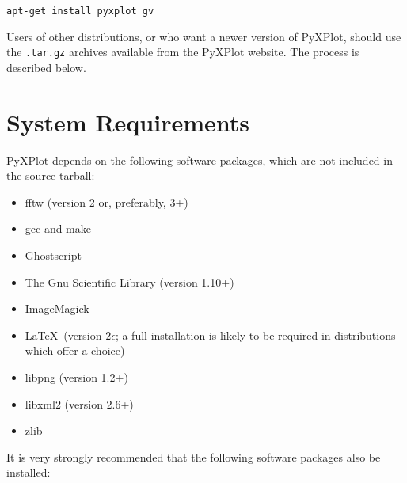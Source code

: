 \begin{verbatim}
apt-get install pyxplot gv
\end{verbatim}

Users of other distributions, or who want a newer version of PyXPlot, should
use the {\tt .tar.gz} archives available from the PyXPlot website. The process
is described below.

\section{System Requirements}

PyXPlot depends on the following software packages, which are not included in
the source tarball:

\vspace{0.5cm}
\begin{itemize}
\item fftw (version 2 or, preferably, 3+) 
\item gcc and make
\item Ghostscript 
\item The Gnu Scientific Library (version 1.10+) 
\item ImageMagick 
\item \LaTeX\ (version $2\epsilon$; a full installation is likely to be required in distributions which offer a choice) 
\item libpng (version 1.2+) 
\item libxml2 (version 2.6+) 
\item zlib 
\end{itemize}
\vspace{0.5cm}

\noindent It is very strongly recommended that the following software packages
also be installed:

